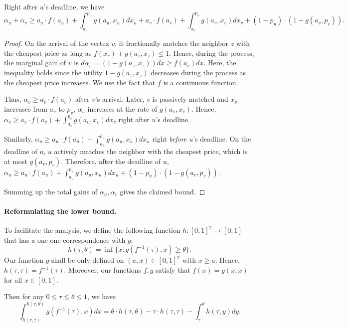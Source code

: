 \begin{lemma}
Right after $u$'s deadline, we have
\begin{equation}
\label{eq:gain}
\alpha_u + \alpha_v \ge a_u \cdot f(a_u) + \int_{a_u}^{p_u} g(a_u, x_u) dx_u + a_v \cdot f(a_v) + \int_{a_v}^{p_v} g(a_v, x_v) dx_v + (1-p_u) \cdot (1-g(a_v, p_v)).
\end{equation}
\end{lemma}

\begin{proof}
On the arrival of the vertex $v$, it fractionally matches the neighbor $z$ with the cheapest price as long as $f(x_v) + g(a_z, x_z) \le 1$. Hence, during the process, the marginal gain of $v$ is $d \alpha_v = (1-g(a_z, x_z)) dx \ge f(a_v) dx$. Here, the inequality holds since the utility $1-g(a_z,x_z)$ decreases during the process as the cheapest price increases. We use the fact that $f$ is a continuous function. 

Thus, $\alpha_v \ge a_v \cdot f(a_v)$ after $v$'s arrival. Later, $v$ is passively matched and $x_v$ increases from $a_v$ to $p_v$, $\alpha_u$ increases at the rate of $g(a_v, x_v)$. Hence, $\alpha_v \ge a_v \cdot f(a_v) + \int_{a_v}^{p_v}g(a_v, x_v)dx_v$ right after $u$'s deadline.

Similarly, $\alpha_u \ge a_u \cdot f(a_u) + \int_{a_u}^{p_u}g(a_u, x_u)dx_u$ right \emph{before} $u$'s deadline.
On the deadline of $u$, $u$ actively matches the neighbor with the cheapest price, which is at most $g(a_v, p_v)$. Therefore, after the deadline of $u$, $\alpha_u \ge a_u \cdot f(a_u) + \int_{a_u}^{p_u}g(a_u, x_u)dx_u + (1-p_u) \cdot (1-g(a_v, p_v))$.

Summing up the total gains of $\alpha_u, \alpha_v$ gives the claimed bound.
\end{proof}

\paragraph{Reformulating the lower bound.}
To facilitate the analysis, we define the following function $h: [0,1]^2 \to [0,1]$ that has a one-one correspondence with $g$:
\[
h(\tau,\theta) = \inf \{x: g(f^{-1}(\tau), x) \ge \theta\}. 
\]
Our function $g$ shall be only defined on $(a, x) \in [0,1]^2$ with $x \ge a$. Hence, $h(\tau,\tau)=f^{-1}(\tau)$. Moreover, our functions $f,g$ satisfy that $f(x) = g(x,x)$ for all $x \in [0,1]$.

Then for any $0 \le \tau \le \theta \le 1$, we have
\[
\int_{h(\tau,\tau)}^{h(\tau,\theta)} g(f^{-1}(\tau),x) dx = \theta \cdot h(\tau, \theta) - \tau \cdot h(\tau, \tau) - \int_{\tau}^{\theta} h(\tau, y) dy.
\]

